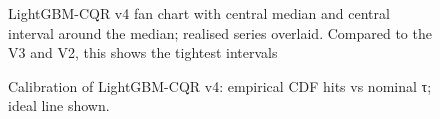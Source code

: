 \documentclass[
  a4paper,
  DIV=11,
  numbers=noendperiod]{scrreprt}
\begin{document}
\begin{figure}


\caption{\label{fig-lgbm-v4-fan-bome}LightGBM-CQR v4 fan chart with
central median and central interval around the median; realised series
overlaid. Compared to the V3 and V2, this shows the tightest intervals}

\end{figure}%

\begin{figure}


\caption{\label{fig-lgbm-v4-calibration}Calibration of LightGBM-CQR v4:
empirical CDF hits vs nominal τ; ideal line shown.}

\end{figure}%
\end{document}
